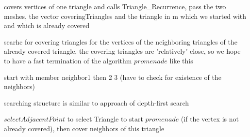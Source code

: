 \documentclass[10pt]{article}
\begin{document}
covers vertices of one triangle and calls {\ttfamily Triangle\_Recurrence}, pass the two meshes, the vector {\ttfamily coveringTriangles} and the triangle in {\ttfamily m} which we started with and which is already covered


searhc for covering triangles for the vertices of the neighboring triangles of the already covered triangle, the covering triangles are 'relatively' close, so we hope to have a fast termination of the algorithm $promenade$ like this

start with member neighbor1 then 2 3 (have to check for existence of the neighbors)

searching structure is similar to approach of depth-first search

$selectAdjacentPoint$ to select Triangle to start $promenade$ (if the vertex is not already covered), then cover neighbors of this triangle
\end{document}
